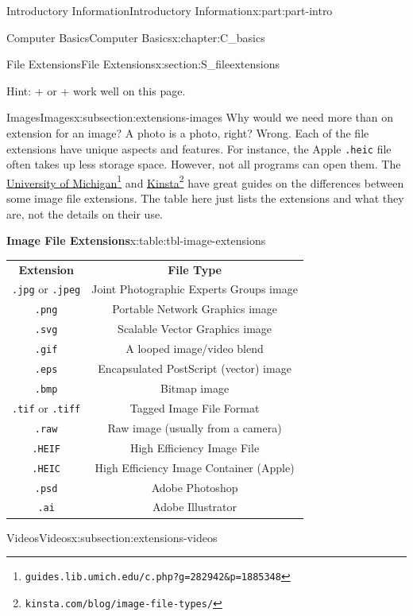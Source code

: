 \documentclass[oneside,10pt,]{book}
\newcommand{\tabularfont}{\relax}
\newcommand{\mono}[1]{\texttt{#1}}
\newcommand{\kbd}[1]{\keys{{#1}}}
\begin{document}
\begin{partptx}{Introductory Information}{}{Introductory Information}{}{}{x:part:part-intro}
\begin{chapterptx}{Computer Basics}{}{Computer Basics}{}{}{x:chapter:C_basics}
\begin{sectionptx}{File Extensions}{}{File Extensions}{}{}{x:section:S_fileextensions}
\begin{introduction}{}
\par
Hint: \kbd{Control} + \kbd{F} or \kbd{Command} + \kbd{F} work well on this page.%
\end{introduction}%
%
%
\typeout{************************************************}
\typeout{************************************************}
%
\begin{subsectionptx}{Images}{}{Images}{}{}{x:subsection:extensions-images}
%
Why would we need more than on extension for an image? A photo is a photo, right? Wrong. Each of the file extensions have unique aspects and features. For instance, the Apple \mono{.heic} file often takes up less storage space. However, not all programs can open them. The \href{https://guides.lib.umich.edu/c.php?g=282942\&p=1885348}{University of Michigan}\footnote{\nolinkurl{guides.lib.umich.edu/c.php?g=282942\&p=1885348}\label{g:fn:idm480909128}} and \href{https://kinsta.com/blog/image-file-types/}{Kinsta}\footnote{\nolinkurl{kinsta.com/blog/image-file-types/}\label{g:fn:idm480907720}} have great guides on the differences between some image file extensions. The table here just lists the extensions and what they are, not the details on their use.%
\begin{tableptx}{\textbf{Image File Extensions}}{x:table:tbl-image-extensions}{}%
\centering%
{\tabularfont%
\begin{tabular}{cc}
\textbf{Extension}&\textbf{File Type}\tabularnewline[0pt]
\mono{.jpg} or \mono{.jpeg}&Joint Photographic Experts Groups image\tabularnewline[0pt]
\mono{.png}&Portable Network Graphics image\tabularnewline[0pt]
\mono{.svg}&Scalable Vector Graphics image\tabularnewline[0pt]
\mono{.gif}&A looped image\slash{}video blend\tabularnewline[0pt]
\mono{.eps}&Encapsulated PostScript (vector) image\tabularnewline[0pt]
\mono{.bmp}&Bitmap image\tabularnewline[0pt]
\mono{.tif} or \mono{.tiff}&Tagged Image File Format\tabularnewline[0pt]
\mono{.raw}&Raw image (usually from a camera)\tabularnewline[0pt]
\mono{.HEIF}&High Efficiency Image File\tabularnewline[0pt]
\mono{.HEIC}&High Efficiency Image Container (Apple)\tabularnewline[0pt]
\mono{.psd}&Adobe Photoshop\tabularnewline[0pt]
\mono{.ai}&Adobe Illustrator
\end{tabular}
}%
\end{tableptx}%
\end{subsectionptx}
%
%
\typeout{************************************************}
\typeout{************************************************}
%
\begin{subsectionptx}{Videos}{}{Videos}{}{}{x:subsection:extensions-videos}

\end{subsectionptx}
\end{sectionptx}
\end{chapterptx}
\end{partptx}
\end{document}
